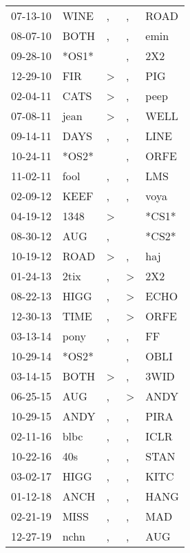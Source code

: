 \begin{supertabular}{lllll}
 07-13-10 &   WINE &                , &                , &   ROAD \\
 08-07-10 &   BOTH &                , &                , &   emin \\
 09-28-10 &  *OS1* &                  &                , &    2X2 \\
 12-29-10 &    FIR &     \textgreater &                , &    PIG \\
 02-04-11 &   CATS &     \textgreater &                , &   peep \\
 07-08-11 &   jean &     \textgreater &                , &   WELL \\
 09-14-11 &   DAYS &                , &                , &   LINE \\
 10-24-11 &  *OS2* &                  &                , &   ORFE \\
 11-02-11 &   fool &                , &                , &    LMS \\
 02-09-12 &   KEEF &                , &                , &   voya \\
 04-19-12 &   1348 &     \textgreater &                  &  *CS1* \\
 08-30-12 &    AUG &                , &                  &  *CS2* \\
 10-19-12 &   ROAD &     \textgreater &                , &    haj \\
 01-24-13 &   2tix &                , &     \textgreater &    2X2 \\
 08-22-13 &   HIGG &                , &     \textgreater &   ECHO \\
 12-30-13 &   TIME &                , &     \textgreater &   ORFE \\
 03-13-14 &   pony &                , &                , &     FF \\
 10-29-14 &  *OS2* &                  &                , &   OBLI \\
 03-14-15 &   BOTH &     \textgreater &                , &   3WID \\
 06-25-15 &    AUG &                , &     \textgreater &   ANDY \\
 10-29-15 &   ANDY &                , &                , &   PIRA \\
 02-11-16 &   blbc &                , &                , &   ICLR \\
 10-22-16 &    40s &                , &                , &   STAN \\
 03-02-17 &   HIGG &                , &                , &   KITC \\
 01-12-18 &   ANCH &                , &                , &   HANG \\
 02-21-19 &   MISS &                , &                , &    MAD \\
 12-27-19 &   nchn &                , &                , &    AUG \\
\end{supertabular}

